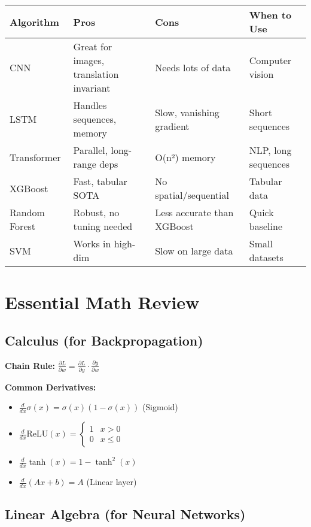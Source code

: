 \documentclass[10pt]{article}
\begin{document}
\begin{center}
\begin{tabular}{|l|l|l|l|}
\hline
\textbf{Algorithm} & \textbf{Pros} & \textbf{Cons} & \textbf{When to Use} \\
\hline
CNN & Great for images, translation invariant & Needs lots of data & Computer vision \\
\hline
LSTM & Handles sequences, memory & Slow, vanishing gradient & Short sequences \\
\hline
Transformer & Parallel, long-range deps & O(n²) memory & NLP, long sequences \\
\hline
XGBoost & Fast, tabular SOTA & No spatial/sequential & Tabular data \\
\hline
Random Forest & Robust, no tuning needed & Less accurate than XGBoost & Quick baseline \\
\hline
SVM & Works in high-dim & Slow on large data & Small datasets \\
\hline
\end{tabular}
\end{center}

\section{Essential Math Review}

\subsection{Calculus (for Backpropagation)}

\textbf{Chain Rule:} $\frac{\partial L}{\partial w} = \frac{\partial L}{\partial y} \cdot \frac{\partial y}{\partial w}$

\textbf{Common Derivatives:}
\begin{itemize}
\item $\frac{d}{dx} \sigma(x) = \sigma(x)(1 - \sigma(x))$ \quad (Sigmoid)
\item $\frac{d}{dx} \text{ReLU}(x) = \begin{cases} 1 & x > 0 \\ 0 & x \leq 0 \end{cases}$
\item $\frac{d}{dx} \tanh(x) = 1 - \tanh^2(x)$
\item $\frac{d}{dx} (Ax + b) = A$ \quad (Linear layer)
\end{itemize}

\subsection{Linear Algebra (for Neural Networks)}
\end{document}
